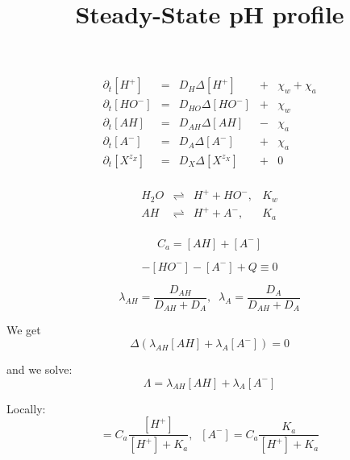 \documentclass[aps,12pt]{revtex4}
\begin{document}
\title{Steady-State pH profile}
\maketitle


\begin{equation}
\begin{array}{rclcl}
	\partial_t [H^+]  & = & D_H \Delta [H^+]     &+&\chi_w+\chi_a\\
	\partial_t [HO^-] & = & D_{HO} \Delta [HO^-] &+&\chi_w\\
	\partial_t [AH]   & = & D_{AH} \Delta [AH]   &-&\chi_a\\
	\partial_t [A^-]  & = & D_{A} \Delta [A^-] &+& \chi_a\\
	\partial_t [X^{z_Z}] & = & D_X \Delta [X^{z_X}] &+& 0\\
\end{array}
\end{equation}

\begin{equation}
	\begin{array}{rcll}
	H_2O  & \rightleftharpoons & H^+ + HO^-, & K_w\\
	AH    & \rightleftharpoons & H^+ + A^-,  & K_a\\
	\end{array}
\end{equation}

\begin{equation}
	C_a = [AH] + [A^-]
\end{equation}

\begin{equation}
	[H^+]-[HO^-]-[A^-]+Q\equiv0
\end{equation}

\begin{equation}
	\lambda_{AH} = \dfrac{D_{AH}}{D_{AH}+D_A}, \;\; \lambda_{A} = \dfrac{D_{A}}{D_{AH}+D_A}
\end{equation}

We get
\begin{equation}
	\Delta\left( \lambda_{AH} [AH] + \lambda_{A} [A^-] \right) = 0
\end{equation}

and we solve:
\begin{equation}
	\Lambda = \lambda_{AH} [AH] + \lambda_{A} [A^-]
\end{equation}	
	
Locally:
\begin{equation}
	[AH] = C_a \dfrac{ [H^+] }{ [H^+] + K_a }, \;\; [A^-] = C_a \dfrac{ K_a }{ [H^+] + K_a }
\end{equation}	
\end{document}
